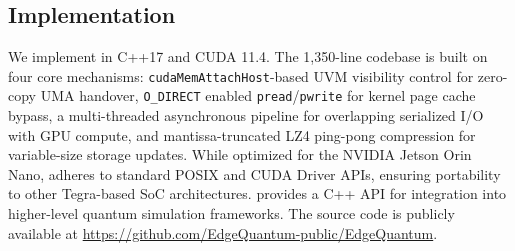 \subsection{\EdgeQuantum Implementation}\label{design_impl}
We implement \EdgeQuantum in C++17 and CUDA 11.4. The  1,350-line codebase is built on four core mechanisms: \texttt{cudaMemAttachHost}-based UVM visibility control for zero-copy UMA handover, \texttt{O\_DIRECT} enabled \texttt{pread}/\texttt{pwrite} for kernel page cache bypass, a multi-threaded asynchronous pipeline for overlapping serialized I/O with GPU compute, and mantissa-truncated LZ4 ping-pong compression for variable-size storage updates.
While optimized for the NVIDIA Jetson Orin Nano, \EdgeQuantum adheres to standard POSIX and CUDA Driver APIs, ensuring portability to other Tegra-based SoC architectures.
\EdgeQuantum provides a C++ API for integration into higher-level quantum simulation frameworks.
The source code is publicly available at \url{https://github.com/EdgeQuantum-public/EdgeQuantum}.